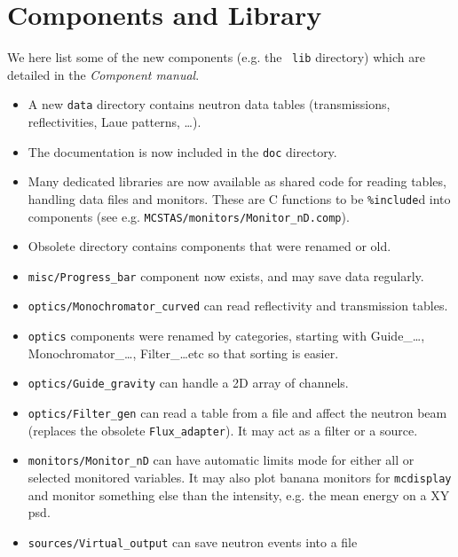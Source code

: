 \section{Components and Library} 
\label{s:new-features:components}
 
  
  We here list some of the new components (e.g. the \MCS\ \verb+lib+ directory) which are detailed in the {\it Component manual}.
  
\begin{itemize}
\item A new \verb+data+ directory contains neutron data tables (transmissions, reflectivities, Laue patterns, \ldots).
\item The documentation is now included in the \verb+doc+ directory.
\item Many dedicated libraries are now available as shared code for reading tables,
    handling data files and monitors. These are C functions to be \texttt{\%include}d
    into components (see e.g. \verb+MCSTAS/monitors/Monitor_nD.comp+).
\item Obsolete directory contains components that were renamed or old.
\item \verb+misc/Progress_bar+ component now exists, and may save data regularly.
\item \verb+optics/Monochromator_curved+ can read reflectivity and transmission tables.
\item \verb+optics+ components were renamed by categories, starting with
   Guide\_\ldots, Monochromator\_\ldots, Filter\_\ldots etc so that sorting is
   easier. 
\item \verb+optics/Guide_gravity+ can handle a 2D array of channels.
\item \verb+optics/Filter_gen+ can read a table from a file and affect the neutron
    beam (replaces the obsolete \verb+Flux_adapter+). It may act as a filter or a
    source.
\item \verb+monitors/Monitor_nD+ can have automatic limits mode for either all or 
    selected monitored variables. It may also plot banana monitors for
    \verb+mcdisplay+ and monitor something else than the intensity, e.g. the mean
    energy on a XY psd. 
\item \verb+sources/Virtual_output+ can save neutron events into a file

\end{itemize}
